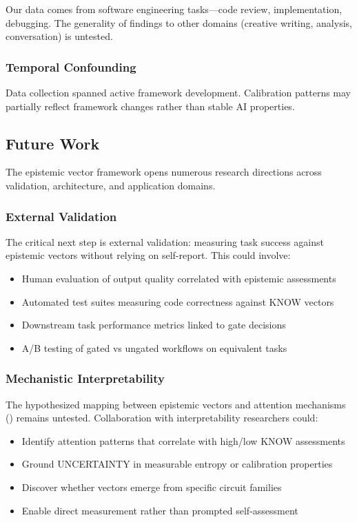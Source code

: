 Our data comes from software engineering tasks---code review, implementation, debugging. The generality of findings to other domains (creative writing, analysis, conversation) is untested.

\subsubsection{Temporal Confounding}

Data collection spanned active framework development. Calibration patterns may partially reflect framework changes rather than stable AI properties.

\subsection{Future Work}

The epistemic vector framework opens numerous research directions across validation, architecture, and application domains.

\subsubsection{External Validation}

The critical next step is external validation: measuring task success against epistemic vectors without relying on self-report. This could involve:

\begin{itemize}
    \item Human evaluation of output quality correlated with epistemic assessments
    \item Automated test suites measuring code correctness against KNOW vectors
    \item Downstream task performance metrics linked to gate decisions
    \item A/B testing of gated vs ungated workflows on equivalent tasks
\end{itemize}

\subsubsection{Mechanistic Interpretability}

The hypothesized mapping between epistemic vectors and attention mechanisms () remains untested. Collaboration with interpretability researchers could:

\begin{itemize}
    \item Identify attention patterns that correlate with high/low KNOW assessments
    \item Ground UNCERTAINTY in measurable entropy or calibration properties
    \item Discover whether vectors emerge from specific circuit families
    \item Enable direct measurement rather than prompted self-assessment
\end{itemize}

